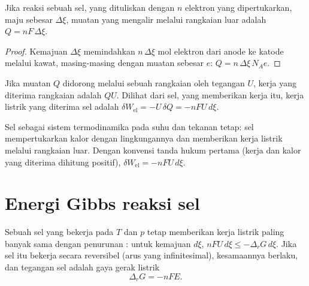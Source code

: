 \begin{proposition}\label{prop:b2:cell-thermodynamics:charge}
Jika reaksi sebuah sel, yang dituliskan dengan $n$ elektron yang
dipertukarkan, maju sebesar $\Delta\xi$, muatan yang mengalir melalui
rangkaian luar adalah $Q =
nF\,\Delta\xi$.
\end{proposition}

\begin{proof}
Kemajuan $\Delta\xi$ memindahkan $n\,\Delta\xi$ mol elektron dari anode ke
katode melalui kawat, masing-masing dengan muatan sebesar $e$:
$Q = n\,\Delta\xi\,N_A e$.
\end{proof}

Jika muatan $Q$ didorong melalui sebuah rangkaian oleh tegangan $U$, kerja
yang diterima rangkaian adalah $QU$. Dilihat dari sel, yang memberikan
kerja itu, kerja listrik yang diterima sel adalah
$\delta W_{\text{el}} = -U\,\delta Q = -nFU\,
d\xi$.

\begin{omfigure}

{\small Sel sebagai sistem termodinamika pada suhu dan tekanan tetap: sel
mempertukarkan kalor dengan lingkungannya dan memberikan kerja listrik
melalui rangkaian luar. Dengan konvensi tanda hukum pertama (kerja dan
kalor yang diterima dihitung positif), $\delta W_{\text{el}} = -nFU\,d\xi$.}
\end{omfigure}

\section{Energi Gibbs reaksi sel}

\begin{theorem}\label{thm:b2:cell-thermodynamics:delta-g-nfe}
Sebuah sel yang bekerja pada $T$ dan $p$ tetap memberikan kerja listrik
paling banyak sama dengan penurunan : untuk kemajuan
$d\xi$, $nFU\,d\xi \leq -\Delta_r G\,d\xi$. Jika sel itu bekerja secara
reversibel (arus yang infinitesimal), kesamaannya berlaku, dan tegangan sel
adalah gaya gerak listrik
\[
  \Delta_r G = -nFE .
\]
\end{theorem}

